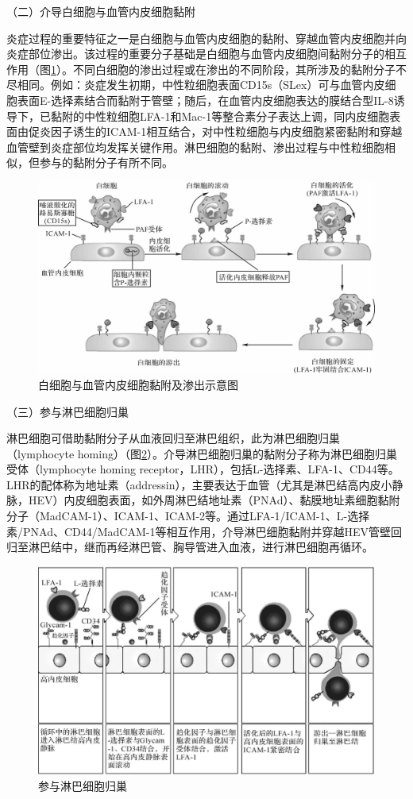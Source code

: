 （二）介导白细胞与血管内皮细胞黏附

炎症过程的重要特征之一是白细胞与血管内皮细胞的黏附、穿越血管内皮细胞并向炎症部位渗出。该过程的重要分子基础是白细胞与血管内皮细胞间黏附分子的相互作用（图\ref{fig8-10}）。不同白细胞的渗出过程或在渗出的不同阶段，其所涉及的黏附分子不尽相同。例如：炎症发生初期，中性粒细胞表面CD15s（SLex）可与血管内皮细胞表面E-选择素结合而黏附于管壁；随后，在血管内皮细胞表达的膜结合型IL-8诱导下，已黏附的中性粒细胞LFA-1和Mac-1等整合素分子表达上调，同内皮细胞表面由促炎因子诱生的ICAM-1相互结合，对中性粒细胞与内皮细胞紧密黏附和穿越血管壁到炎症部位均发挥关键作用。淋巴细胞的黏附、渗出过程与中性粒细胞相似，但参与的黏附分子有所不同。

\begin{figure}[!htbp]
 \centering
 \includegraphics{./images/Image00120.jpg}
 \captionsetup{justification=centering}
 \caption{白细胞与血管内皮细胞黏附及渗出示意图}
 \label{fig8-10}
  \end{figure} 

（三）参与淋巴细胞归巢

淋巴细胞可借助黏附分子从血液回归至淋巴组织，此为淋巴细胞归巢（lymphocyte
homing）（图\ref{fig8-11}）。介导淋巴细胞归巢的黏附分子称为淋巴细胞归巢受体（lymphocyte
homing
receptor，LHR），包括L-选择素、LFA-1、CD44等。LHR的配体称为地址素（addressin），主要表达于血管（尤其是淋巴结高内皮小静脉，HEV）内皮细胞表面，如外周淋巴结地址素（PNAd）、黏膜地址素细胞黏附分子（MadCAM-1）、ICAM-1、ICAM-2等。通过LFA-1/ICAM-1、L-选择素/PNAd、CD44/MadCAM-1等相互作用，介导淋巴细胞黏附并穿越HEV管壁回归至淋巴结中，继而再经淋巴管、胸导管进入血液，进行淋巴细胞再循环。

\begin{figure}[!htbp]
 \centering
 \includegraphics[width=.6\textwidth]{./images/Image00121.jpg}
 \captionsetup{justification=centering}
 \caption{参与淋巴细胞归巢}
 \label{fig8-11}
  \end{figure} 

